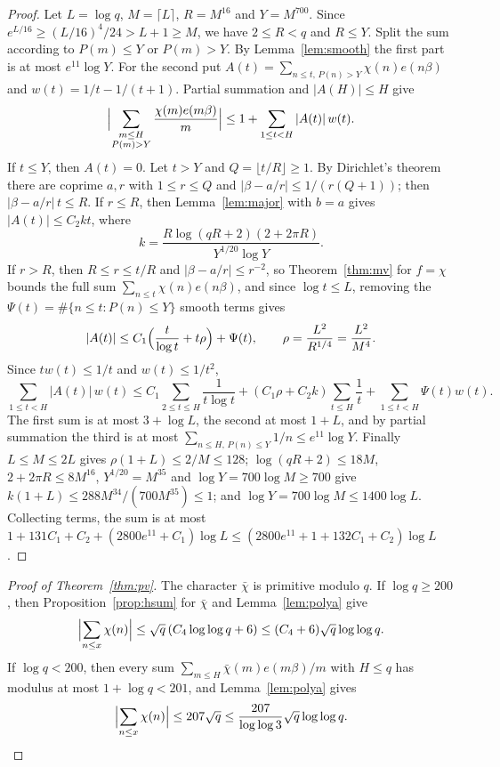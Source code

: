 \documentclass[12pt]{amsart}
\theoremstyle{remark}
\begin{document}
\begin{proof}
Let $L=\log q$, $M=\lceil L\rceil$, $R=M^{16}$ and $Y=M^{700}$. Since
$e^{L/16}\ge(L/16)^4/24>L+1\ge M$, we have $2\le R<q$ and $R\le Y$. Split the sum according to $P(m)\le Y$ or
$P(m)>Y$. By Lemma~\ref{lem:smooth} the first part is at most $e^{11}\log Y$. For the second
put $A(t)=\sum_{n\le t,\,P(n)>Y}\chi(n)e(n\beta)$ and $w(t)=1/t-1/(t+1)$. Partial summation and
$|A(H)|\le H$ give
\[
  \Bigl|\sum_{\substack{m\le H\\P(m)>Y}}\frac{\chi(m)e(m\beta)}m\Bigr|\le1+\sum_{1\le t<H}|A(t)|\,w(t).
\]
If $t\le Y$, then $A(t)=0$. Let $t>Y$ and $Q=\lfloor t/R\rfloor\ge1$. By Dirichlet's theorem there
are coprime $a,r$ with $1\le r\le Q$ and $|\beta-a/r|\le1/(r(Q+1))$; then $|\beta-a/r|\,t\le R$.
If $r\le R$, then Lemma~\ref{lem:major} with $b=a$ gives $|A(t)|\le C_2kt$, where
\[
  k=\frac{R\log(qR+2)(2+2\pi R)}{Y^{1/20}\log Y}.
\]
If $r>R$, then $R\le r\le t/R$ and $|\beta-a/r|\le r^{-2}$, so Theorem~\ref{thm:mv} for $f=\chi$
bounds the full sum $\sum_{n\le t}\chi(n)e(n\beta)$, and since $\log t\le L$, removing the
$\Psi(t)=\#\{n\le t:P(n)\le Y\}$ smooth terms gives
\[
  |A(t)|\le C_1\Bigl(\frac t{\log t}+t\rho\Bigr)+\Psi(t),\qquad
  \rho=\frac{L^2}{R^{1/4}}=\frac{L^2}{M^4}.
\]
Since $tw(t)\le1/t$ and $w(t)\le1/t^2$,
\[
  \sum_{1\le t<H}|A(t)|\,w(t)\le C_1\sum_{2\le t\le H}\frac1{t\log t}
  +(C_1\rho+C_2k)\sum_{t\le H}\frac1t+\sum_{1\le t<H}\Psi(t)w(t).
\]
The first sum is at most $3+\log L$, the second at most $1+L$, and by partial summation the third
is at most $\sum_{n\le H,\,P(n)\le Y}1/n\le e^{11}\log Y$. Finally $L\le M\le2L$ gives
$\rho(1+L)\le2/M\le128$; $\log(qR+2)\le18M$, $2+2\pi R\le8M^{16}$, $Y^{1/20}=M^{35}$ and
$\log Y=700\log M\ge700$ give $k(1+L)\le288M^{34}/(700M^{35})\le1$; and
$\log Y=700\log M\le1400\log L$. Collecting terms, the sum is at most
$1+131C_1+C_2+(2800e^{11}+C_1)\log L\le(2800e^{11}+1+132C_1+C_2)\log L$.
\end{proof}

\begin{proof}[Proof of Theorem~\ref{thm:pv}]
The character $\bar\chi$ is primitive modulo $q$. If $\log q\ge200$, then
Proposition~\ref{prop:hsum} for $\bar\chi$ and Lemma~\ref{lem:polya} give
\[
  \Bigl|\sum_{n\le x}\chi(n)\Bigr|\le\sqrt q\,(C_4\log\log q+6)\le(C_4+6)\sqrt q\log\log q.
\]
If $\log q<200$, then every sum $\sum_{m\le H}\bar\chi(m)e(m\beta)/m$ with $H\le q$ has modulus at
most $1+\log q<201$, and Lemma~\ref{lem:polya} gives
\[
  \Bigl|\sum_{n\le x}\chi(n)\Bigr|\le207\sqrt q\le\frac{207}{\log\log3}\sqrt q\log\log q.\qedhere
\]
\end{proof}
\end{document}
